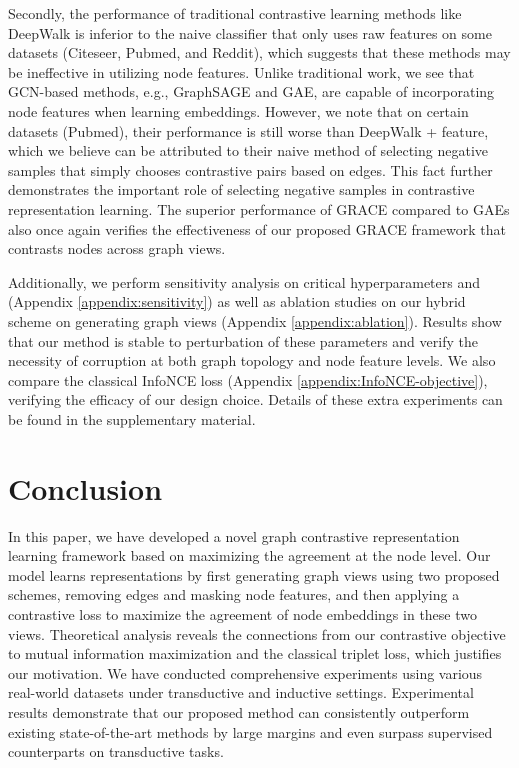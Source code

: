 \documentclass{article}
\theoremstyle{remark}
\begin{document}
Secondly, the performance of traditional contrastive learning methods like DeepWalk is inferior to the naive classifier that only uses raw features on some datasets (Citeseer, Pubmed, and Reddit), which suggests that these methods may be ineffective in utilizing node features.
Unlike traditional work, we see that GCN-based methods, e.g., GraphSAGE and GAE, are capable of incorporating node features when learning embeddings. However, we note that on certain datasets (Pubmed), their performance is still worse than DeepWalk + feature, which we believe can be attributed to their naive method of selecting negative samples that simply chooses contrastive pairs based on edges.
This fact further demonstrates the important role of selecting negative samples in contrastive representation learning. The superior performance of GRACE compared to GAEs also once again verifies the effectiveness of our proposed GRACE framework that contrasts nodes across graph views.



Additionally, we perform sensitivity analysis on critical hyperparameters  and  (Appendix \ref{appendix:sensitivity}) as well as ablation studies on our hybrid scheme on generating graph views (Appendix \ref{appendix:ablation}). Results show that our method is stable to perturbation of these parameters and verify the necessity of corruption at both graph topology and node feature levels. We also compare the classical InfoNCE loss (Appendix \ref{appendix:InfoNCE-objective}), verifying the efficacy of our design choice. Details of these extra experiments can be found in the supplementary material.
 \section{Conclusion}

In this paper, we have developed a novel graph contrastive representation learning framework based on maximizing the agreement at the node level. Our model learns representations by first generating graph views using two proposed schemes, removing edges and masking node features, and then applying a contrastive loss to maximize the agreement of node embeddings in these two views. Theoretical analysis reveals the connections from our contrastive objective to mutual information maximization and the classical triplet loss, which justifies our motivation. We have conducted comprehensive experiments using various real-world datasets under transductive and inductive settings. Experimental results demonstrate that our proposed method can consistently outperform existing state-of-the-art methods by large margins and even surpass supervised counterparts on transductive tasks.
\end{document}
